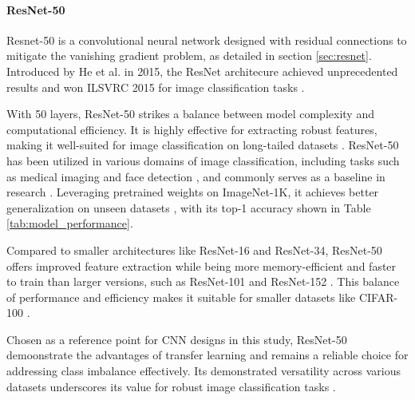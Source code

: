 \paragraph{ResNet-50}
Resnet-50 \cite{he2015deepresiduallearningimage} is a convolutional neural network designed with residual connections to mitigate the vanishing gradient problem, as detailed in section \ref{sec:resnet}. Introduced by He et al. in 2015, the ResNet architecure achieved unprecedented results and won ILSVRC 2015 for image classification tasks \cite{ILSVRC15}. 

With 50 layers, ResNet-50 strikes a balance between model complexity and computational efficiency. It is highly effective for extracting robust features, making it well-suited for image classification on long-tailed datasets \cite{he2015deepresiduallearningimage}. ResNet-50 has been utilized in various domains of image classification, including tasks such as medical imaging \cite{huang2022identifyingkeycomponentsresnet50, Simegn} and face detection \cite{Nyarko2022}, and commonly serves as a baseline in research \cite{yun2019cutmixregularizationstrategytrain,cubuk2019randaugmentpracticalautomateddata,zhang2018mixupempiricalriskminimization}. Leveraging pretrained weights on ImageNet-1K, it achieves better generalization on unseen datasets \cite{resnettransfer,RAZAVI2024123276,chan2019transfer,Shafiq2022}, with its top-1 accuracy shown in Table \ref{tab:model_performance}. 

Compared to smaller architectures like ResNet-16 and ResNet-34, ResNet-50 offers improved feature extraction while being more memory-efficient and faster to train than larger versions, such as ResNet-101 and ResNet-152 \cite{he2015deepresiduallearningimage}. This balance of performance and efficiency makes it suitable for smaller datasets like CIFAR-100 \cite{10083966}.

Chosen as a reference point for CNN designs in this study, ResNet-50 demoonstrate the advantages of transfer learning and remains a reliable choice for addressing class imbalance effectively. Its demonstrated versatility across various datasets underscores its value for robust image classification tasks \cite{he2015deepresiduallearningimage,yun2019cutmixregularizationstrategytrain,}.

